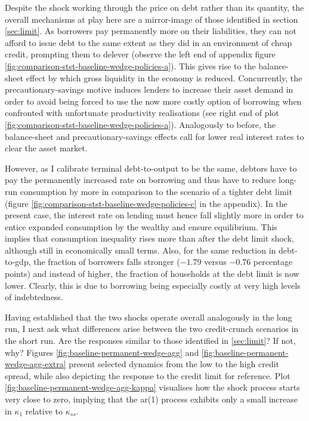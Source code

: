 \documentclass[a4paper,12pt]{article} %
\numberwithin{equation}{section} %
\numberwithin{figure}{section}
\numberwithin{table}{section}
\begin{document}
Despite the shock working through the price on debt rather than its quantity, the overall mechanisms at play here are a mirror-image of those identified in section \ref{sec:limit}. As borrowers pay permanently more on their liabilities, they can not afford to issue debt to the same extent as they did in an environment of cheap credit, prompting them to delever (observe the left end of appendix figure \ref{fig:comparison-stst-baseline-wedge-policies-a}). This gives rise to the balance-sheet effect by which gross liquidity in the economy is reduced. Concurrently, the precautionary-savings motive induces lenders to increase their asset demand in order to avoid being forced to use the now more costly option of borrowing when confronted with unfortunate productivity realisations (see right end of plot \ref{fig:comparison-stst-baseline-wedge-policies-a}). Analogously to before, the balance-sheet and precautionary-savings effects call for lower real interest rates to clear the asset market. 

However, as I calibrate terminal debt-to-output to be the same, debtors have to pay the permanently increased rate on borrowing and thus have to reduce long-run consumption by more in comparison to the scenario of a tighter debt limit (figure \ref{fig:comparison-stst-baseline-wedge-policies-c} in the appendix). In the present case, the interest rate on lending must hence fall slightly more in order to entice expanded consumption by the wealthy and ensure equilibrium. This implies that consumption inequality rises more than after the debt limit shock, although still in economically small terms. Also, for the same reduction in debt-to-\Gls{gdp}, the fraction of borrowers falls stronger ($-1.79$ versus $-0.76$ percentage points) and instead of higher, the fraction of households at the debt limit is now lower. Clearly, this is due to borrowing being especially costly at very high levels of indebtedness.

Having established that the two shocks operate overall analogously in the long run, I next ask what differences arise between the two credit-crunch scenarios in the short run. Are the responses similar to those identified in \ref{sec:limit}? If not, why? Figures \ref{fig:baseline-permanent-wedge-agg} and \ref{fig:baseline-permanent-wedge-agg-extra} present selected dynamics from the low to the high credit spread, while also depicting the response to the credit limit for reference. Plot \ref{fig:baseline-permanent-wedge-agg-kappa} visualises how the shock process starts very close to zero, implying that the \Gls{ar}(1) process exhibits only a small increase in $\kappa_1$ relative to $\kappa_{ss}$. 
\end{document}
